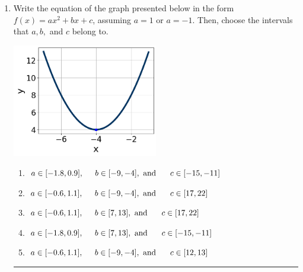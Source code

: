 \documentclass[14pt]{extbook}
\newcommand{\litem}[1]{\item#1\hspace*{-1cm}\rule{\textwidth}{0.4pt}}
\begin{document}
\begin{enumerate}
{\begin{enumerate}[label=\Alph*.]
\end{enumerate} }
\litem{
Write the equation of the graph presented below in the form $f(x)=ax^2+bx+c$, assuming  $a=1$ or $a=-1$. Then, choose the intervals that $a, b,$ and $c$ belong to.
\begin{center}
    \includegraphics[width=0.5\textwidth]{../Figures/quadraticGraphToEquationCopyC.png}
\end{center}
\begin{enumerate}[label=\Alph*.]
\item \( a \in [-1.8, 0.9], \hspace*{5mm} b \in [-9, -4], \text{ and } \hspace*{5mm} c \in [-15, -11] \)
\item \( a \in [-0.6, 1.1], \hspace*{5mm} b \in [-9, -4], \text{ and } \hspace*{5mm} c \in [17, 22] \)
\item \( a \in [-0.6, 1.1], \hspace*{5mm} b \in [7, 13], \text{ and } \hspace*{5mm} c \in [17, 22] \)
\item \( a \in [-1.8, 0.9], \hspace*{5mm} b \in [7, 13], \text{ and } \hspace*{5mm} c \in [-15, -11] \)
\item \( a \in [-0.6, 1.1], \hspace*{5mm} b \in [-9, -4], \text{ and } \hspace*{5mm} c \in [12, 13] \)


\end{enumerate}}
\end{enumerate}
\end{document}
